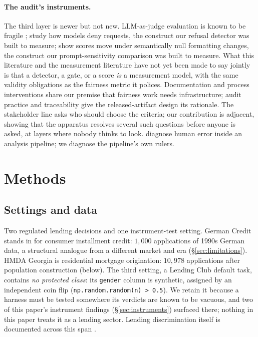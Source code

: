 \documentclass[sigconf,nonacm]{acmart}
\begin{document}
\paragraph{The audit's instruments.} The third layer is newer but not new.
LLM-as-judge evaluation is known to be fragile \citep{zheng2023};
\citet{wester2024} study how models deny requests, the construct our
refusal detector was built to measure; \citet{sclar2024} show scores move
under semantically null formatting changes, the construct our
prompt-sensitivity comparison was built to measure. What this literature and
the measurement literature have not yet been made to say jointly is that a
detector, a gate, or a score \emph{is} a measurement model, with the same
validity obligations as the fairness metric it polices. Documentation and
process interventions \citep{mitchell2019,gebru2021,madaio2020} share our
premise that fairness work needs infrastructure; audit practice
\citep{metaxa2021,raji2019,raji2020} and traceability \citep{kroll2021} give
the released-artifact design its rationale. The stakeholder line
\citep{luo2025,luo2026,luo2026b,deshpande2022,stumpf2024,kim2025} asks who
should choose the criteria; our contribution is adjacent, showing that the
apparatus resolves several such questions before anyone is asked, at layers
where nobody thinks to look. \citet{zamfirescu2022} diagnose human error
inside an analysis pipeline; we diagnose the pipeline's own rulers.

\section{Methods}
\label{sec:apparatus}

\subsection{Settings and data}
Two regulated lending decisions and one instrument-test
setting. German Credit \citep{germancredit} stands in for consumer installment
credit: $1{,}000$ applications of 1990s German data, a structural analogue
from a different market and era (\S\ref{sec:limitations}). HMDA
Georgia
\citep{hmda} is residential mortgage origination: $10{,}978$ applications
after population construction (below). The third setting, a Lending Club
default task, contains \emph{no protected class}: its \texttt{gender} column
is synthetic, assigned by an independent coin flip
(\texttt{np.random.random(n) > 0.5}). We retain it because a harness must be
tested somewhere its verdicts are known to be vacuous, and two of this paper's
instrument findings (\S\ref{sec:instruments}) surfaced there; nothing in this
paper treats it as a lending sector. Lending discrimination itself is
documented across this span \citep{duarte2012,pope2011,bartlett2019,butler2017,sarwal2024}.
\end{document}
